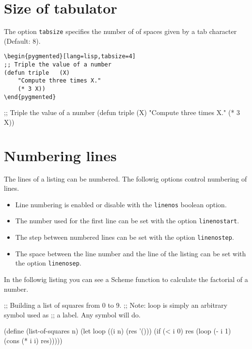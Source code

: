 \documentclass[10pt,a4paper]{article}
\begin{document}
\section{Size of tabulator}

The option \verb|tabsize| specifies the number of of spaces given by a
tab character (Default: 8).

\begin{Verbatim}[showtabs,tabsize=1]
\begin{pygmented}[lang=lisp,tabsize=4]
;; Triple the value of a number
(defun triple	(X)
	"Compute three times X."
	(* 3 X))
\end{pygmented}
\end{Verbatim}

\begin{pygmented}[lang=lisp,tabsize=4]
;; Triple the value of a number
(defun triple	(X)
	"Compute three times X."
	(* 3 X))
\end{pygmented}


\section{Numbering lines}

The lines of a listing can be numbered. The followig options control
numbering of lines.
\begin{itemize}
  \item Line numbering is enabled or disable with the \verb|linenos|
  boolean option.
  \item The number used for the first line can be set with the option
  \verb|linenostart|.
  \item The step between numbered lines can be set with the option
  \verb|linenostep|.
  \item The space between the line number and the line of the listing
  can be set with the option \verb|linenosep|.
\end{itemize}

In the followig listing you can see a Scheme function to calculate the
factorial of a number.

\begin{Example}
\begin{pygmented}[lang=scheme,linenos,linenostart=1001,linenostep=2,linenosep=5mm]
;; Building a list of squares from 0 to 9.
;; Note: loop is simply an arbitrary symbol used as
;; a label. Any symbol will do.
 
(define (list-of-squares n)
  (let loop ((i n) (res '()))
    (if (< i 0)
        res
        (loop (- i 1) (cons (* i i) res)))))
\end{pygmented}
\end{Example}
\end{document}
